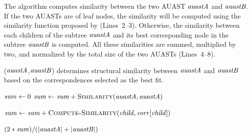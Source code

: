 

The  algorithm computes similarity between the two AUAST $\mathit{auastA}$ and $\mathit{auastB}$. If the two AUASTs are of leaf nodes, the similarity will be computed using the similarity function proposed by \citet{2008:fse:cottrell} (Lines~2--3). Otherwise, the similarity between each children of the subtree $\mathit{auastA}$ and its best corresponding node in the subtree $\mathit{auastB}$ is computed. All these similarities are summed, multiplied by two, and normalized by the total size of the two AUASTs (Lines~4--8).





\begin{algorithm}
 \caption{($\mathit{auastA}$,$\mathit{auastB}$) determines structural similarity between $\mathit{auastA}$ and $\mathit{auastB}$ based on the correspondences selected as the best fit.}
  \label{simi}
  \begin{algorithmic}[1]
  \ComputeSimilarityy
  \State $\mathit{sum} \gets 0$  
  \State $\mathit{sum} \gets  \mathit{sum} + \textsc{Similarity}(\mathit{auastA},\mathit{auastA})$
 		
 		\State $\mathit{sum} \gets \mathit{sum}+\textsc{Compute-Similarity}(\mathit{child},\mathit{corr}[\mathit{child}])$		
 \EndFor
 
 \EndIf
 \Return $(2*\mathit{sum}) / ({|\mathit{auastA}| + |\mathit{auastB}|})$
 
\end{algorithmic}
\end{algorithm}



